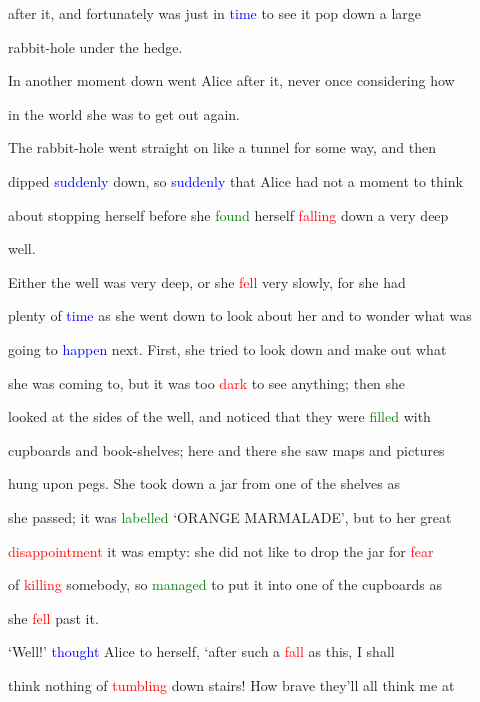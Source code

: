  after it, and fortunately was just in \textcolor{blue}{time} to see it \textcolor{BurntOrange}{pop} down a large

 rabbit-hole under the hedge.



 In another moment down went Alice after it, never once considering how

 in the world she was to get out again.



 The rabbit-hole went straight on like a tunnel for some way, and then

 dipped \textcolor{blue}{suddenly} down, so \textcolor{blue}{suddenly} that Alice had not a moment to think

 about stopping herself before she \textcolor{green}{found} herself \textcolor{red}{falling} down a very deep

 well.



 Either the well was very deep, or she \textcolor{red}{fell} very slowly, for she had

 plenty of \textcolor{blue}{time} as she went down to look about her and to wonder what was

 going to \textcolor{blue}{happen} next. First, she tried to look down and make out what

 she was coming to, but it was too \textcolor{red}{dark} to see anything; then she

 looked at the sides of the well, and noticed that they were \textcolor{green}{filled} with

 cupboards and book-shelves; here and there she saw maps and pictures

 hung upon pegs. She took down a jar from one of the shelves as

 she passed; it was \textcolor{green}{labelled} ‘ORANGE MARMALADE’, but to her great

 \textcolor{red}{disappointment} it was empty: she did not like to drop the jar for \textcolor{red}{fear}

 of \textcolor{red}{killing} somebody, so \textcolor{green}{managed} to put it into one of the cupboards as

 she \textcolor{red}{fell} past it.



 ‘Well!’ \textcolor{blue}{thought} Alice to herself, ‘after such a \textcolor{red}{fall} as this, I shall

 think nothing of \textcolor{red}{tumbling} down stairs! How brave they’ll all think me at

